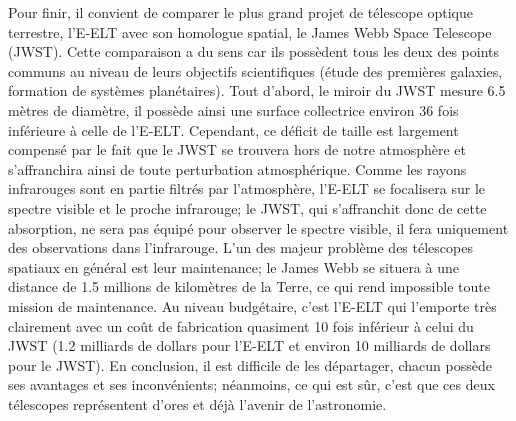 Pour finir, il convient de comparer le plus grand projet de télescope optique terrestre, l'E-ELT avec son homologue spatial, le James Webb Space Telescope (JWST). Cette comparaison a du sens car ils possèdent tous les deux des points communs au niveau de leurs objectifs scientifiques (étude des premières galaxies, formation de systèmes planétaires). Tout d'abord, le miroir du JWST mesure 6.5 mètres de diamètre, il possède ainsi une surface collectrice environ 36 fois inférieure à celle de l'E-ELT. Cependant, ce déficit de taille est largement compensé par le fait que le JWST se trouvera hors de notre atmosphère et s'affranchira ainsi de toute perturbation atmosphérique. Comme les rayons infrarouges sont en partie filtrés par l'atmosphère, l'E-ELT se focalisera sur le spectre visible et le proche infrarouge; le JWST, qui s'affranchit donc de cette absorption, ne sera pas équipé pour observer le spectre visible, il fera uniquement des observations dans l'infrarouge. L'un des majeur problème des télescopes spatiaux en général est leur maintenance; le James Webb se situera à une distance de 1.5 millions de kilomètres de la Terre, ce qui rend impossible toute mission de maintenance. Au niveau budgétaire, c'est l'E-ELT qui l'emporte très clairement avec un coût de fabrication quasiment 10 fois inférieur à celui du JWST (1.2 milliards de dollars pour l'E-ELT et environ 10 milliards de dollars pour le JWST). En conclusion, il est difficile de les départager, chacun possède ses avantages et ses inconvénients; néanmoins, ce qui est sûr, c'est que ces deux télescopes représentent d'ores et déjà l'avenir de l'astronomie. 